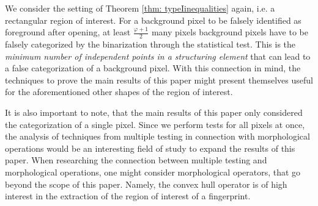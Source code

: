 \documentclass[a4paper,12pt]{article}
\theoremstyle{plain}
\theoremstyle{definition}
\begin{document}
We consider the setting of Theorem \ref{thm: typeIinequalities} again, i.e. a rectangular region of interest. For a background pixel to be falsely identified as foreground after opening, at least $\frac{\varphi + 1}{2}$ many pixels background pixels have to be falsely categorized by the binarization through the statistical test. This is the \emph{minimum number of independent points in a structuring element} that can lead to a false categorization of a background pixel. With this connection in mind, the techniques to prove the main results of this paper might present themselves useful for the aforementioned other shapes of the region of interest.

It is also important to note, that the main results of this paper only considered the categorization of a single pixel. Since we perform tests for all pixels at once, the analysis of techniques from multiple testing in connection with morphological operations would be an interesting field of study to expand the results of this paper. When researching the connection between multiple testing and morphological operations, one might consider morphological operators, that go beyond the scope of this paper. Namely, the convex hull operator is of high interest in the extraction of the region of interest of a fingerprint.

\newpage
\end{document}
